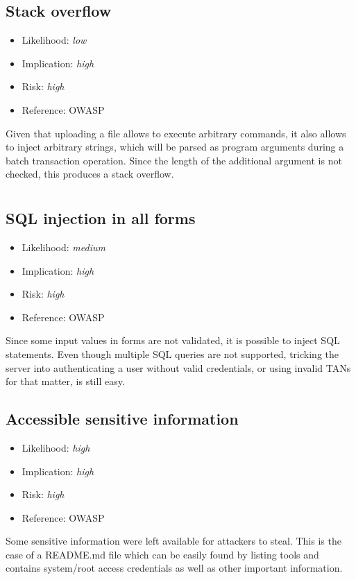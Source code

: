 \subsection{Stack overflow} \label{over:stack}
\begin{itemize}
	\item Likelihood: \textit{low}
	\item Implication: \textit{high}
	\item Risk: \textit{high}
	\item Reference: OWASP 
\end{itemize}
Given that uploading a file allows to execute arbitrary commands, it also allows to inject arbitrary strings, which will be parsed as program arguments during a batch transaction operation. Since the length of the additional argument is not checked, this produces a stack overflow.

\section{\gnb}
\subsection{SQL injection in all forms} \label{over:sqlgnb}
\begin{itemize}
	\item Likelihood: \textit{medium}
	\item Implication: \textit{high}
	\item Risk: \textit{high}
	\item Reference: OWASP 
\end{itemize}
Since some input values in forms are not validated, it is possible to inject SQL statements. Even though multiple SQL queries are not supported, tricking the server into authenticating a user without valid credentials, or using invalid TANs for that matter, is still easy.
\clearpage

\subsection{Accessible sensitive information} \label{over:configuration}
\begin{itemize}
	\item Likelihood: \textit{high}
	\item Implication: \textit{high}
	\item Risk: \textit{high}
	\item Reference: OWASP 
\end{itemize}
Some sensitive information were left available for attackers to steal. This is the case of a README.md file which can be easily found by listing tools and contains system/root access credentials as well as other important information.

